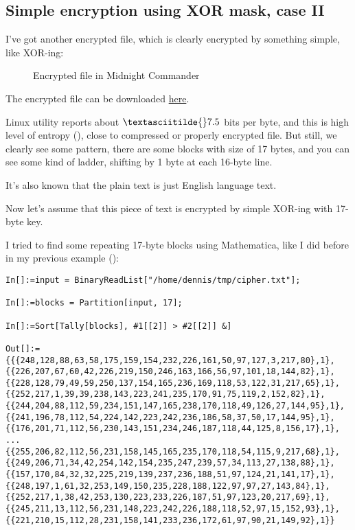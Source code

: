 \subsection{Simple encryption using XOR mask, case II}
\label{XOR_mask_2}

I've got another encrypted file, which is clearly encrypted by something simple, like XOR-ing:

\begin{figure}[H]
\centering
{}
\caption{Encrypted file in Midnight Commander}
\end{figure}

The encrypted file can be downloaded \href{https://github.com/DennisYurichev/RE-for-beginners/blob/master/ff/XOR/mask_2/files/cipher.txt}{here}.

 Linux utility reports about $\textasciitilde{}7.5$ bits per byte, and this is high level of entropy (),
close to compressed or properly encrypted file.
But still, we clearly see some pattern, there are some blocks with size of 17 bytes, and you can see some kind of ladder,
shifting by 1 byte at each 16-byte line.

It's also known that the plain text is just English language text.

Now let's assume that this piece of text is encrypted by simple XOR-ing with 17-byte key.

I tried to find some repeating 17-byte blocks using Mathematica, like I did before in my previous example ():

\begin{lstlisting}[caption=Mathematica,style=custommath]
In[]:=input = BinaryReadList["/home/dennis/tmp/cipher.txt"];

In[]:=blocks = Partition[input, 17];

In[]:=Sort[Tally[blocks], #1[[2]] > #2[[2]] &]

Out[]:={{{248,128,88,63,58,175,159,154,232,226,161,50,97,127,3,217,80},1},
{{226,207,67,60,42,226,219,150,246,163,166,56,97,101,18,144,82},1},
{{228,128,79,49,59,250,137,154,165,236,169,118,53,122,31,217,65},1},
{{252,217,1,39,39,238,143,223,241,235,170,91,75,119,2,152,82},1},
{{244,204,88,112,59,234,151,147,165,238,170,118,49,126,27,144,95},1},
{{241,196,78,112,54,224,142,223,242,236,186,58,37,50,17,144,95},1},
{{176,201,71,112,56,230,143,151,234,246,187,118,44,125,8,156,17},1},
...
{{255,206,82,112,56,231,158,145,165,235,170,118,54,115,9,217,68},1},
{{249,206,71,34,42,254,142,154,235,247,239,57,34,113,27,138,88},1},
{{157,170,84,32,32,225,219,139,237,236,188,51,97,124,21,141,17},1},
{{248,197,1,61,32,253,149,150,235,228,188,122,97,97,27,143,84},1},
{{252,217,1,38,42,253,130,223,233,226,187,51,97,123,20,217,69},1},
{{245,211,13,112,56,231,148,223,242,226,188,118,52,97,15,152,93},1},
{{221,210,15,112,28,231,158,141,233,236,172,61,97,90,21,149,92},1}}
\end{lstlisting}


